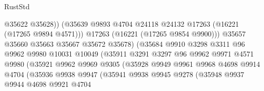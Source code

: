 \begin{lexlean}{RustStd}
\begin{coremodule}
                                        @35622
                                        @35628))
                                    (@35639
                                      @9893
                                      @4704
                                      @24118
                                      @24132
                                      @17263
                                      (@16221 (@17265 @9894 @4571)))
                                    @17263
                                    (@16221 (@17265 @9854 @9900)))
                                  @35657
                                  @35660
                                  @35663
                                  @35667
                                  @35672
                                  @35678)
                                (@35684
                                  @9910
                                  @3298
                                  @3311
                                  @96
                                  @9962
                                  @9980
                                  @10031
                                  @10049
                                  (@35911
                                    @3291
                                    @3297
                                    @96
                                    @9962
                                    @9971
                                    @4571
                                    @9980
                                    (@35921
                                      @9962
                                      @9969
                                      @9305
                                      (@35928
                                        @9949
                                        @9961
                                        @9968
                                        @4698
                                        @9914
                                        @4704
                                        (@35936
                                          @9938
                                          @9947
                                          (@35941
                                            @9938
                                            @9945
                                            @9278
                                            (@35948
                                              @9937
                                              @9944
                                              @4698
                                              @9921
                                              @4704

\end{coremodule}
\end{lexlean}
